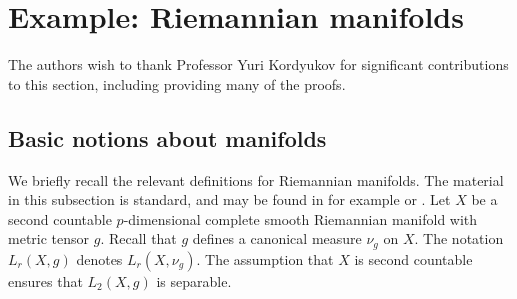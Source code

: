 % 
% 

\section{Example: Riemannian manifolds}\label{manifold section}

    The authors wish to thank Professor Yuri Kordyukov for significant contributions to this section, including providing many of the proofs.

\subsection{Basic notions about manifolds}
    
    We briefly recall the relevant definitions for Riemannian manifolds. The material in this subsection is standard,
    and may be found in for example \cite[Chapter 2]{rosenberg} or \cite{Lawson-Michelsohn-1989}. 
    Let $X$ be a second countable $p$-dimensional complete smooth Riemannian manifold with metric tensor $g$.
    Recall that $g$ defines a canonical measure $\nu_g$ on $X$. The notation $L_r(X,g)$ denotes $L_r(X,\nu_g)$. The assumption that $X$ is second countable
    ensures that $L_2(X,g)$ is separable.
    
